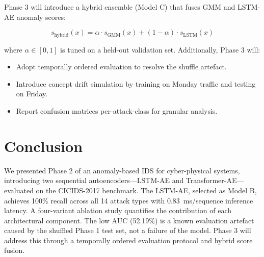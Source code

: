\documentclass[conference]{IEEEtran}
\begin{document}
Phase 3 will introduce a hybrid ensemble (Model C) that fuses GMM and LSTM-AE anomaly scores:

\begin{equation}
  s_\text{hybrid}(x) = \alpha \cdot s_\text{GMM}(x) + (1-\alpha) \cdot s_\text{LSTM}(x)
\end{equation}

where $\alpha \in [0,1]$ is tuned on a held-out validation set. Additionally, Phase 3 will:
\begin{itemize}
  \item Adopt temporally ordered evaluation to resolve the shuffle artefact.
  \item Introduce concept drift simulation by training on Monday traffic and testing on Friday.
  \item Report confusion matrices per-attack-class for granular analysis.
\end{itemize}

\section{Conclusion}

We presented Phase 2 of an anomaly-based IDS for cyber-physical systems, introducing two
sequential autoencoders—LSTM-AE and Transformer-AE—evaluated on the CICIDS-2017 benchmark.
The LSTM-AE, selected as Model B, achieves 100\% recall across all 14 attack types with
0.83~ms/sequence inference latency. A four-variant ablation study quantifies the contribution
of each architectural component. The low AUC (52.19\%) is a known evaluation artefact caused
by the shuffled Phase 1 test set, not a failure of the model. Phase 3 will address this through
a temporally ordered evaluation protocol and hybrid score fusion.
\end{document}
